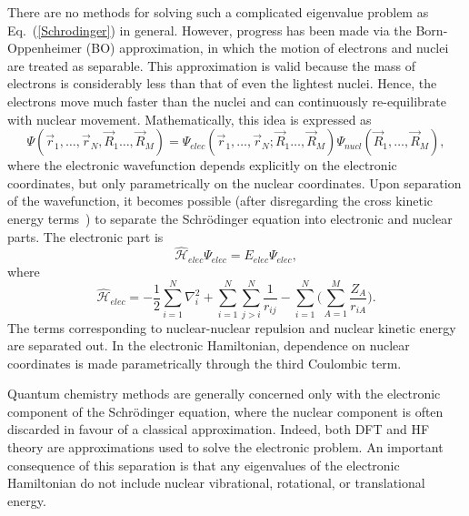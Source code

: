 \documentclass[titlepage,11pt]{article}
\newcommand{\Ham}{\widehat{\mathcal{H}}}
\begin{document}
There are no methods for solving such a complicated eigenvalue problem as Eq.~(\ref{Schrodinger}) in general. However, progress has been made via the Born-Oppenheimer (BO) approximation, in which the motion of electrons and nuclei are treated as separable. This approximation is valid because the mass of electrons is considerably less than that of even the lightest nuclei. Hence, the electrons move much faster than the nuclei and can continuously re-equilibrate with nuclear movement. Mathematically, this idea is expressed as
\begin{equation}
\Psi(\vec{r}_{1}, \ldots , \vec{r}_{N}, \vec{R}_{1}\ldots , \vec{R}_{M}) = \Psi_{elec}(\vec{r}_{1}, \ldots , \vec{r}_{N}; \vec{R}_{1}\ldots , \vec{R}_{M}) \Psi_{nucl}(\vec{R}_{1},\ldots , \vec{R}_{M}),
\end{equation}
where the electronic wavefunction depends explicitly on the electronic coordinates, but only parametrically on the nuclear coordinates. Upon separation of the wavefunction, it becomes possible (after disregarding the cross kinetic energy terms~\cite{szabo2012modern}) to separate the Schr\"{o}dinger equation into electronic and nuclear parts. The electronic part is
\begin{equation}
\Ham_{elec} \Psi_{elec} = E_{elec} \Psi_{elec},
\end{equation}
where
\begin{equation}
\Ham_{elec} = -\frac{1}{2}\sum_{i=1}^{N} \nabla^{2}_{i} + \sum_{i=1}^{N} \sum_{j>i}^{N} \frac{1}{r_{ij}} - \sum_{i=1}^{N} \bigg( \sum_{A=1}^{M} \frac{Z_{A}}{r_{iA}}\bigg).
\end{equation}
The terms corresponding to nuclear-nuclear repulsion and nuclear kinetic energy are separated out. In the electronic Hamiltonian, dependence on nuclear coordinates is made parametrically through the third Coulombic term. 

Quantum chemistry methods are generally concerned only with the electronic component of the Schr\"{o}dinger equation, where the nuclear component is often discarded in favour of a classical approximation. Indeed, both DFT and HF theory are approximations used to solve the electronic problem. An important consequence of this separation is that any eigenvalues of the electronic Hamiltonian do not include nuclear vibrational, rotational, or translational energy. 
\end{document}
